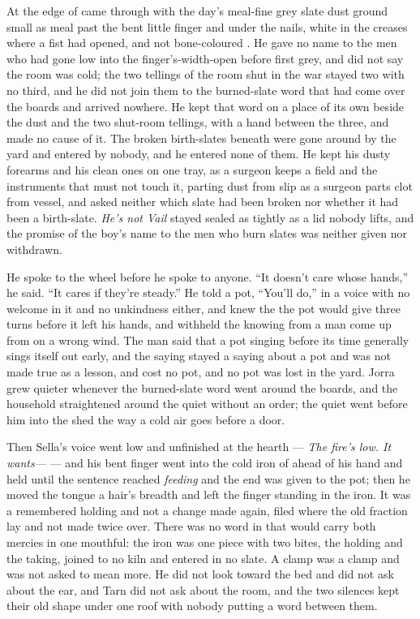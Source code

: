 At the edge of   came through with the day's meal-fine grey slate dust ground small as meal past the bent little finger and under the nails, white in the creases where a fist had opened, and not bone-coloured . He gave no name to the men who had gone low into the finger's-width-open  before first grey, and did not say the room was cold; the two tellings of the room shut in the war stayed two with no third, and he did not join them to the burned-slate word that had come over the boards and arrived nowhere. He kept that word on a place of its own beside the dust and the two shut-room tellings, with a hand between the three, and made no cause of it. The broken birth-slates beneath  were gone around by the yard and entered by nobody, and he entered none of them. He kept his dusty forearms and his clean ones on one tray, as a surgeon keeps a field and the instruments that must not touch it, parting dust from slip as a surgeon parts clot from vessel, and asked neither which slate had been broken nor whether it had been a birth-slate. \emph{He's not Vail} stayed sealed as tightly as a lid nobody lifts, and the promise of the boy's name to the men who burn slates was neither given nor withdrawn.

He spoke to the wheel before he spoke to anyone. “It doesn't care whose hands,” he said. “It cares if they're steady.” He told a pot, “You'll do,” in a voice with no welcome in it and no unkindness either, and knew the  the pot would give three turns before it left his hands, and withheld the knowing from a man come up from  on a wrong wind. The man said that a pot singing before its time generally sings itself out early, and the saying stayed a saying about a pot and was not made true as a lesson, and cost no pot, and no pot was lost in the yard. Jorra grew quieter whenever the burned-slate word went around the boards, and the household straightened around the quiet without an order; the quiet went before him into the shed the way a cold air goes before a door.

Then Sella's voice went low and unfinished at the hearth --- \emph{The fire's low. It wants---} --- and his bent finger went into the cold iron of  ahead of his hand and held until the sentence reached \emph{feeding} and the end was given to the pot; then he moved the tongue a hair's breadth and left the finger standing in the iron. It was a remembered holding and not a change made again, filed where the old fraction lay and not made twice over. There was no word in  that would carry both mercies in one mouthful: the iron was one piece with two bites, the holding and the taking, joined to no kiln and entered in no slate. A clamp was a clamp and was not asked to mean more. He did not look toward the bed and did not ask about the ear, and Tarn did not ask about the room, and the two silences kept their old shape under one roof with nobody putting a word between them.

